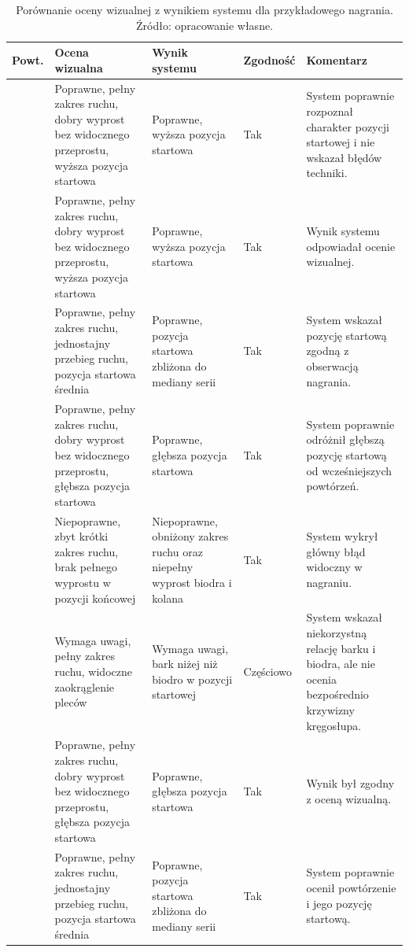 \begin{table}[H]
\centering
\caption{Porównanie oceny wizualnej z wynikiem systemu dla przykładowego nagrania. Źródło: opracowanie własne.}
\label{tab:porownanie-oceny-powtorzen}
\footnotesize
\renewcommand{\arraystretch}{1.08}
\setlength{\tabcolsep}{2.5pt}
\begin{tabular}{|
>{\centering\arraybackslash}p{1.05cm}|
>{\raggedright\arraybackslash}p{4.25cm}|
>{\raggedright\arraybackslash}p{3.95cm}|
>{\centering\arraybackslash}p{1.65cm}|
>{\raggedright\arraybackslash}p{3.85cm}|}
\hline
\textbf{Powt.} & \textbf{Ocena wizualna} & \textbf{Wynik systemu} & \textbf{Zgodność} & \textbf{Komentarz} \\ \hline
1 & Poprawne, pełny zakres ruchu, dobry wyprost bez widocznego przeprostu, wyższa pozycja startowa & Poprawne, wyższa pozycja startowa & Tak & System poprawnie rozpoznał charakter pozycji startowej i nie wskazał błędów techniki. \\ \hline
2 & Poprawne, pełny zakres ruchu, dobry wyprost bez widocznego przeprostu, wyższa pozycja startowa & Poprawne, wyższa pozycja startowa & Tak & Wynik systemu odpowiadał ocenie wizualnej. \\ \hline
3 & Poprawne, pełny zakres ruchu, jednostajny przebieg ruchu, pozycja startowa średnia & Poprawne, pozycja startowa zbliżona do mediany serii & Tak & System wskazał pozycję startową zgodną z obserwacją nagrania. \\ \hline
4 & Poprawne, pełny zakres ruchu, dobry wyprost bez widocznego przeprostu, głębsza pozycja startowa & Poprawne, głębsza pozycja startowa & Tak & System poprawnie odróżnił głębszą pozycję startową od wcześniejszych powtórzeń. \\ \hline
5 & Niepoprawne, zbyt krótki zakres ruchu, brak pełnego wyprostu w pozycji końcowej & Niepoprawne, obniżony zakres ruchu oraz niepełny wyprost biodra i kolana & Tak & System wykrył główny błąd widoczny w nagraniu. \\ \hline
6 & Wymaga uwagi, pełny zakres ruchu, widoczne zaokrąglenie pleców & Wymaga uwagi, bark niżej niż biodro w pozycji startowej & Częściowo & System wskazał niekorzystną relację barku i biodra, ale nie ocenia bezpośrednio krzywizny kręgosłupa. \\ \hline
7 & Poprawne, pełny zakres ruchu, dobry wyprost bez widocznego przeprostu, głębsza pozycja startowa & Poprawne, głębsza pozycja startowa & Tak & Wynik był zgodny z oceną wizualną. \\ \hline
8 & Poprawne, pełny zakres ruchu, jednostajny przebieg ruchu, pozycja startowa średnia & Poprawne, pozycja startowa zbliżona do mediany serii & Tak & System poprawnie ocenił powtórzenie i jego pozycję startową. \\ \hline
\end{tabular}
\end{table}

